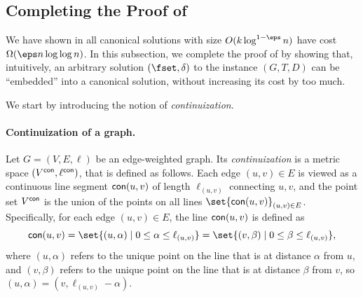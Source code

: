 \newcommand{\dia}{\textsf{diam}}
\newcommand{\girth}{g}
\newcommand{\con}{\textnormal{\textsf{con}}}
\newcommand{\lcon}{\ell^{\con}}
\newcommand{\Vcon}{V^{\con}}
\subsection{Completing the Proof of }
\label{subsec: mapping}

We have shown in  all canonical solutions with size $O(k\log^{1-\eps} n)$ have cost $\Omega(\eps n\log\log n)$. In this subsection, we complete the proof of  by showing that, intuitively, an arbitrary solution $(\fset,\delta)$ to the instance $(G,T,D)$ can be ``embedded'' into a canonical solution, without increasing its cost by too much. 

We start by introducing the notion of \emph{continuization}.

\paragraph{Continuization of a graph.}
Let $G=(V,E,\ell)$ be an edge-weighted graph. Its \emph{continuization} is a metric space $(V^{\con},\ell^{\con})$, that is defined as follows. 
Each edge $(u,v)\in E$ is viewed as a continuous line segment $\con(u,v)$ of length $\ell_{(u,v)}$ connecting $u,v$, and the point set $V^{\con}$ is the union of the points on all lines $\set{\con(u,v)}_{(u,v)\in E}$. 
Specifically, for each edge $(u,v)\in E$, the line $\con(u,v)$ is defined as \[\con(u,v)=\set{(u,\alpha)\mid 0\le \alpha\le \ell_{(u,v)}}=\set{(v,\beta)\mid 0\le \beta\le \ell_{(u,v)}},\]
where $(u,\alpha)$ refers to the unique point on the line that is at distance $\alpha$ from $u$, and $(v,\beta)$ refers to the unique point on the line that is at distance $\beta$ from $v$, so $(u,\alpha)=(v,\ell_{(u,v)}-\alpha)$.

